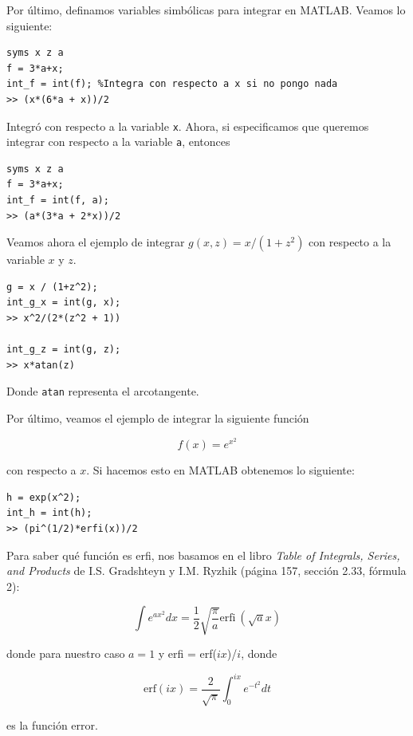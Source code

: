 Por último, definamos variables simbólicas para integrar en MATLAB. Veamos lo siguiente:

\begin{lstlisting}
syms x z a
f = 3*a+x;
int_f = int(f); %Integra con respecto a x si no pongo nada
>> (x*(6*a + x))/2
\end{lstlisting}

Integró con respecto a la variable \texttt{x}. Ahora, si especificamos que queremos integrar con respecto a la variable \texttt{a}, entonces


\begin{lstlisting}
syms x z a
f = 3*a+x;
int_f = int(f, a); 
>> (a*(3*a + 2*x))/2
\end{lstlisting}


Veamos ahora el ejemplo de integrar $g(x, z) = x / (1+z^2)$ con respecto a la variable $x$ y $z$.


\begin{lstlisting}
g = x / (1+z^2);
int_g_x = int(g, x);
>> x^2/(2*(z^2 + 1))

int_g_z = int(g, z);
>> x*atan(z)
\end{lstlisting}


\noindent Donde \texttt{atan} representa el arcotangente.

Por último, veamos el ejemplo de integrar la siguiente función

\begin{equation}
    f(x) = e^{x^2}
\end{equation}


\noindent con respecto a $x$. Si hacemos esto en MATLAB obtenemos lo siguiente:

\begin{lstlisting}
h = exp(x^2);
int_h = int(h);
>> (pi^(1/2)*erfi(x))/2
\end{lstlisting}


Para saber qué función es erfi, nos basamos en el libro \textit{Table of Integrals, Series, and Products} de I.S. Gradshteyn y I.M. Ryzhik (página 157, sección 2.33, fórmula 2):

\begin{equation}
    \int e^{ax^2}dx = \frac{1}{2}\sqrt{\frac{\pi}{a}} \text{erfi}\ (\sqrt{a}x)
\end{equation}


\noindent donde para nuestro caso $a = 1$ y erfi = erf($ix$)/$i$, donde 


\begin{equation}
    \text{erf}(ix) = \frac{2}{\sqrt{\pi}}\int_{0}^{ix} e^{-t^2}dt 
\end{equation}

\noindent es la función error. 



